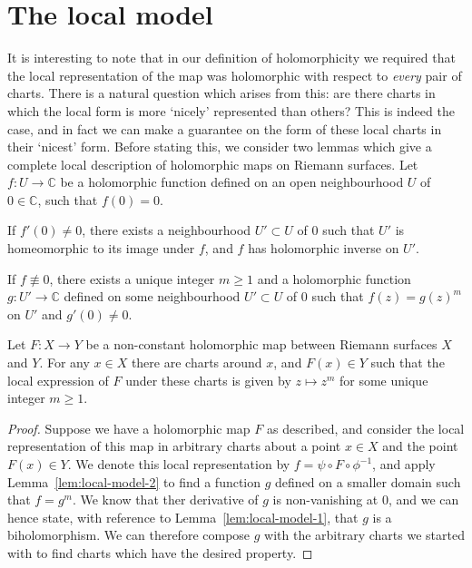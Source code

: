 \section{The local model}
It is interesting to note that in our definition of holomorphicity we required
that the local representation of the map was holomorphic with respect to
\textit{every} pair of charts. There is a natural question which arises from
this: are there charts in which the local form is more `nicely' represented than
others? This is indeed the case, and in fact we can make a guarantee on the form
of these local charts in their `nicest' form. Before stating this, we consider
two lemmas which give a complete local description of holomorphic maps on
Riemann surfaces. Let $ f:U \to
	\mathbb{C} $ be a holomorphic function defined on an open neighbourhood $ U $ of
$ 0 \in \mathbb{C} $, such that $ f(0)=0 $.

\begin{lemma}\label{lem:local-model-1}
	If $ f'(0) \neq 0 $, there exists a neighbourhood $ U' \subset U $ of $ 0 $
	such that $ U' $ is homeomorphic to its image under $ f $, and $ f $ has
	holomorphic inverse on $ U' $.
\end{lemma}

\begin{lemma}\label{lem:local-model-2}
	If $ f \not \equiv 0 $, there exists a unique integer $ m \geq 1 $ and a
	holomorphic function $ g:U' \to \mathbb{C} $ defined on some neighbourhood $
		U' \subset U $ of $ 0 $ such that $ f(z) = g(z)^{m} $ on $ U' $ and $
		g'(0)\neq0 $.
\end{lemma}

\begin{theorem}\label{thm:local-normal-form}
	Let $ F:X \to Y $ be a non-constant holomorphic map between Riemann
	surfaces $ X $ and $ Y $. For any $ x \in X $ there are charts around $ x $,
	and $ F(x)\in Y$ such that the local expression of $ F $ under these charts is
	given by $ z \mapsto z^m $ for some unique integer $ m\geq 1 $.
	\begin{proof}
		Suppose we have a holomorphic map $ F $ as described, and consider the local
		representation of this map in arbitrary charts about a point $ x \in X $ and
		the point $ F(x) \in Y $. We denote this local representation by $ f = \psi
			\circ F \circ \phi ^{-1} $, and apply Lemma~\ref{lem:local-model-2} to find
		a function $ g $ defined on a smaller domain such that $ f = g^m $. We know
		that ther derivative of $ g $ is non-vanishing at $ 0 $, and we can hence
		state, with reference to Lemma~\ref{lem:local-model-1}, that $ g $ is a
		biholomorphism. We can therefore compose $ g $ with the arbitrary charts we
		started with to find charts which have the desired property.
	\end{proof}
\end{theorem}


